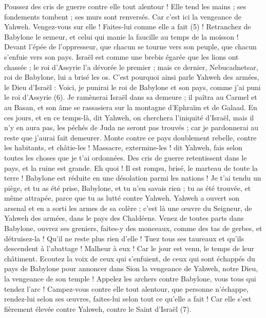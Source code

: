\begin{multicols}{2}
Poussez des cris de guerre contre elle tout alentour ! Elle tend les mains ; ses fondements tombent ; ses murs sont renversés. Car c'est ici la vengeance de Yahweh. Vengez-vous sur elle ! Faites-lui comme elle a fait\FTNT{} (5) !
Retranchez de Babylone le semeur, et celui qui manie la faucille au temps de la moisson ! Devant l'épée de l'oppresseur, que chacun se tourne vers son peuple, que chacun s'enfuie vers son pays.
Israël est comme une brebis égarée que les lions ont chassée ; le roi d'Assyrie l'a dévorée le premier ; mais ce dernier, Nebucadnetsar, roi de Babylone, lui a brisé les os.
C'est pourquoi ainsi parle Yahweh des armées, le Dieu d'Israël : Voici, je punirai le roi de Babylone et son pays, comme j'ai puni le roi d'Assyrie\FTNT{} (6).
Je ramènerai Israël dans sa demeure ; il paîtra au Carmel et au Basan, et son âme se rassasiera sur la montagne d'Ephraïm et de Galaad.
En ces jours, et en ce temps-là, dit Yahweh, on cherchera l'iniquité d'Israël, mais il n'y en aura pas, les péchés de Juda ne seront pas trouvés ; car je pardonnerai au reste que j'aurai fait demeurer.
Monte contre ce pays doublement rebelle, contre les habitants, et châtie-les ! Massacre, extermine-les ! dit Yahweh, fais selon toutes les choses que je t'ai ordonnées.
Des cris de guerre retentissent dans le pays, et la ruine est grande.
Eh quoi ! Il est rompu, brisé, le marteau de toute la terre ! Babylone est réduite en une désolation parmi les nations !
Je t'ai tendu un piège, et tu as été prise, Babylone, et tu n'en savais rien ; tu as été trouvée, et même attrapée, parce que tu as lutté contre Yahweh.
Yahweh a ouvert son arsenal et en a sorti les armes de sa colère ; c'est là une œuvre du Seigneur, de Yahweh des armées, dans le pays des Chaldéens.
Venez de toutes parts dans Babylone, ouvrez ses greniers, faites-y des monceaux, comme des tas de gerbes, et détruisez-la ! Qu'il ne reste plus rien d'elle !
Tuez tous ses taureaux et qu'ils descendent à l'abattage ! Malheur à eux ! Car le jour est venu, le temps de leur châtiment.
Ecoutez la voix de ceux qui s'enfuient, de ceux qui sont échappés du pays de Babylone pour annoncer dans Sion la vengeance de Yahweh, notre Dieu, la vengeance de son temple !
Appelez les archers contre Babylone, vous tous qui tendez l'arc ! Campez-vous contre elle tout alentour, que personne n'échappe, rendez-lui selon ses œuvres, faites-lui selon tout ce qu'elle a fait ! Car elle s'est fièrement élevée contre Yahweh, contre le Saint d'Israël\FTNT{} (7).

\end{multicols}
